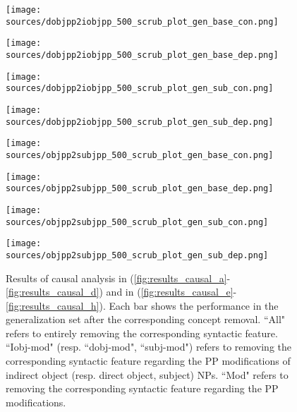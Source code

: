 \begin{figure*}[t]
    \centering
    \begin{minipage}[b]{0.245\linewidth}
    \centering
    \texttt{[image: sources/dobjpp2iobjpp\_500\_scrub\_plot\_gen\_base\_con.png]}
    \label{fig:results_causal_a}
    \end{minipage}
    \begin{minipage}[b]{0.245\linewidth}
    \centering
    \texttt{[image: sources/dobjpp2iobjpp\_500\_scrub\_plot\_gen\_base\_dep.png]}
    \label{fig:results_causal_b}
    \end{minipage}
    \begin{minipage}[b]{0.245\linewidth}
    \centering
    \texttt{[image: sources/dobjpp2iobjpp\_500\_scrub\_plot\_gen\_sub\_con.png]}
    \label{fig:results_causal_c}
    \end{minipage}
    \begin{minipage}[b]{0.245\linewidth}
    \centering
    \texttt{[image: sources/dobjpp2iobjpp\_500\_scrub\_plot\_gen\_sub\_dep.png]}
    \label{fig:results_causal_d}
    \end{minipage}
    \begin{minipage}[b]{0.245\linewidth}
    \centering
    \texttt{[image: sources/objpp2subjpp\_500\_scrub\_plot\_gen\_base\_con.png]}
    \label{fig:results_causal_e}
    \end{minipage}
    \begin{minipage}[b]{0.245\linewidth}
    \centering
    \texttt{[image: sources/objpp2subjpp\_500\_scrub\_plot\_gen\_base\_dep.png]}
    \label{fig:results_causal_f}
    \end{minipage}
    \begin{minipage}[b]{0.245\linewidth}
    \centering
    \texttt{[image: sources/objpp2subjpp\_500\_scrub\_plot\_gen\_sub\_con.png]}
    \label{fig:results_causal_g}
    \end{minipage}
    \begin{minipage}[b]{0.245\linewidth}
    \centering
    \texttt{[image: sources/objpp2subjpp\_500\_scrub\_plot\_gen\_sub\_dep.png]}
    \label{fig:results_causal_h}
    \end{minipage}
    \caption{Results of causal analysis in \dobjppiobjpp{} (\ref{fig:results_causal_a}-\ref{fig:results_causal_d}) and in \dobjppsubjpp{} (\ref{fig:results_causal_e}-\ref{fig:results_causal_h}).
    Each bar shows the performance in the generalization set after the corresponding concept removal.
    ``All" refers to entirely removing the corresponding syntactic feature.
    ``Iobj-mod" (resp. ``dobj-mod", ``subj-mod") refers to removing the corresponding syntactic feature regarding the PP modifications of indirect object (resp. direct object, subject) NPs.
    ``Mod" refers to removing the corresponding syntactic feature regarding the PP modifications.}
    \label{fig:results_causal}
\end{figure*}